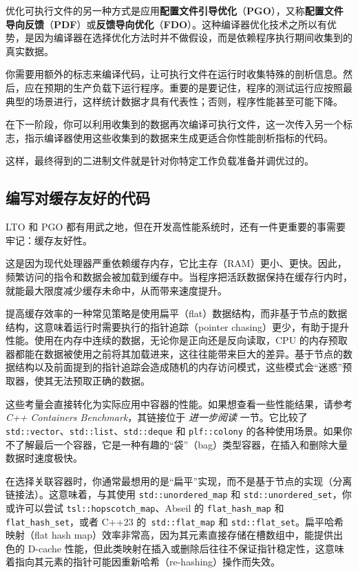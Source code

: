\label{idx:1219}
\label{idx:1220}
\label{idx:1221}
\label{idx:1222}
优化可执行文件的另一种方式是应用\textbf{配置文件引导优化}（\textbf{PGO}），又称\textbf{配置文件导向反馈}（\textbf{PDF}）或\textbf{反馈导向优化}（\textbf{FDO}）。这种编译器优化技术之所以有优势，是因为编译器在选择优化方法时并不做假设，而是依赖程序执行期间收集到的真实数据。

你需要用额外的标志来编译代码，让可执行文件在运行时收集特殊的剖析信息。然后，应在预期的生产负载下运行程序。重要的是要记住，程序的测试运行应按照最典型的场景进行，这样统计数据才具有代表性；否则，程序性能甚至可能下降。

在下一阶段，你可以利用收集到的数据再次编译可执行文件，这一次传入另一个标志，指示编译器使用这些收集到的数据来生成更适合你性能剖析指标的代码。

这样，最终得到的二进制文件就是针对你特定工作负载准备并调优过的。

\subsection{编写对缓存友好的代码}

LTO 和 PGO 都有用武之地，但在开发高性能系统时，还有一件更重要的事需要牢记：缓存友好性。

\label{idx:1223}
\label{idx:1224}
这是因为现代处理器严重依赖缓存内存，它比主存（RAM）更小、更快。因此，频繁访问的指令和数据会被加载到缓存中。当程序把活跃数据保持在缓存行内时，就能最大限度减少缓存未命中，从而带来速度提升。

提高缓存效率的一种常见策略是使用扁平（flat）数据结构，而非基于节点的数据结构，这意味着运行时需要执行的指针追踪（pointer chasing）更少，有助于提升性能。使用在内存中连续的数据，无论你是正向还是反向读取，CPU 的内存预取器都能在数据被使用之前将其加载进来，这往往能带来巨大的差异。基于节点的数据结构以及前面提到的指针追踪会造成随机的内存访问模式，这些模式会“迷惑”预取器，使其无法预取正确的数据。

这些考量会直接转化为实际应用中容器的性能。如果想查看一些性能结果，请参考 \emph{C++ Containers Benchmark}，其链接位于 \emph{进一步阅读} 一节。它比较了 \texttt{std::\allowbreak{}vector}、\texttt{std::list}、\texttt{std::\allowbreak{}deque} 和 \texttt{plf::\allowbreak{}colony} 的各种使用场景。如果你不了解最后一个容器，它是一种有趣的“袋”（bag）类型容器，在插入和删除大量数据时速度极快。

\label{idx:1225}
在选择关联容器时，你通常最想用的是“扁平”实现，而不是基于节点的实现（分离链接法）。这意味着，与其使用 \texttt{std::\allowbreak{}unordered\_\allowbreak{}map} 和 \texttt{std::\allowbreak{}unordered\_\allowbreak{}set}，你或许可以尝试 \texttt{tsl::\allowbreak{}hopscotch\_\allowbreak{}map}、Abseil 的 \texttt{flat\_\allowbreak{}hash\_\allowbreak{}map} 和 \texttt{flat\_\allowbreak{}hash\_\allowbreak{}set}，或者 C++23 的\texttt{ std::\allowbreak{}flat\_\allowbreak{}map} 和 \texttt{std::\allowbreak{}flat\_\allowbreak{}set}。扁平哈希映射（flat hash map）效率非常高，因为其元素直接存储在槽数组中，能提供出色的 D-cache 性能，但此类映射在插入或删除后往往不保证指针稳定性，这意味着指向其元素的指针可能因重新哈希（re-hashing）操作而失效。

